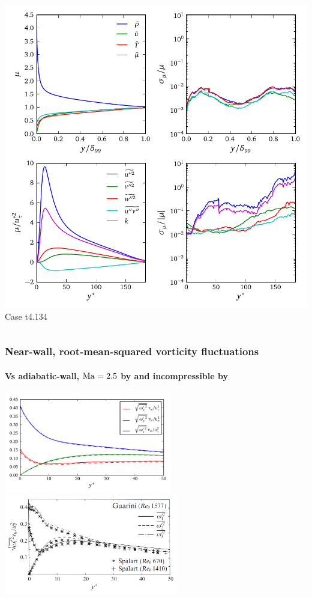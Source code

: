\documentclass[mathserif]{beamer}
\begin{document}
\begin{frame}
\begin{columns}
\begin{column}{0.5\linewidth}
          \includegraphics[width=\textwidth]{profile-t4134}
          \\
          Case t4.134
        \end{column}
    \end{columns}
\end{frame}

\begin{frame}
    \frametitle{Near-wall, root-mean-squared vorticity fluctuations}
    \framesubtitle{%
        Vs
        adiabatic-wall, $\mbox{Ma}_{} = 2.5$ by
        \citet{Guarini2000Direct} and incompressible by
        \citet{Spalart1988Direct}
    }
    \centering
    \vspace{0.1em}
    \includegraphics[width=0.55\textwidth]{hqd_vort}
    \\\vspace{-0.65em}
    \includegraphics[width=0.57\textwidth]{GuariniJFM2000Figure8_Reworked}\hspace{1.15em}
\end{frame}
\end{document}
